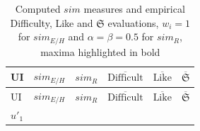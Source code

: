 \hypertarget{tbl:ci:sim}{}
\begin{longtable}[]{@{}llllll@{}}
\caption{\label{tbl:ci:sim}Computed \(sim\) measures and empirical Difficulty, Like and \(\mathfrak{S}\) evaluations, \(w_i=1\) for \(sim_{E/H}\) and \(\alpha=\beta=0.5\) for \(sim_R\), maxima highlighted in bold}\tabularnewline
\toprule
\begin{minipage}[b]{0.15\columnwidth}\raggedright
UI\strut
\end{minipage} & \begin{minipage}[b]{0.08\columnwidth}\raggedright
\(sim_{E/H}\)\strut
\end{minipage} & \begin{minipage}[b]{0.07\columnwidth}\raggedright
\(sim_R\)\strut
\end{minipage} & \begin{minipage}[b]{0.20\columnwidth}\raggedright
\(\overline{\text{Difficult}}\)\strut
\end{minipage} & \begin{minipage}[b]{0.17\columnwidth}\raggedright
\(\overline{\text{Like}}\)\strut
\end{minipage} & \begin{minipage}[b]{0.17\columnwidth}\raggedright
\(\overline{\mathfrak{S}}\)\strut
\end{minipage}\tabularnewline
\midrule
\endfirsthead
\toprule
\begin{minipage}[b]{0.15\columnwidth}\raggedright
UI\strut
\end{minipage} & \begin{minipage}[b]{0.08\columnwidth}\raggedright
\(sim_{E/H}\)\strut
\end{minipage} & \begin{minipage}[b]{0.07\columnwidth}\raggedright
\(sim_R\)\strut
\end{minipage} & \begin{minipage}[b]{0.20\columnwidth}\raggedright
\(\overline{\text{Difficult}}\)\strut
\end{minipage} & \begin{minipage}[b]{0.17\columnwidth}\raggedright
\(\overline{\text{Like}}\)\strut
\end{minipage} & \begin{minipage}[b]{0.17\columnwidth}\raggedright
\(\overline{\mathfrak{S}}\)\strut
\end{minipage}\tabularnewline
\midrule
\endhead
\begin{minipage}[t]{0.15\columnwidth}\raggedright
\(u'_1\)\strut
\end{minipage} & \begin{minipage}[t]{0.08\columnwidth}\raggedright

\end{minipage}
\end{longtable}
